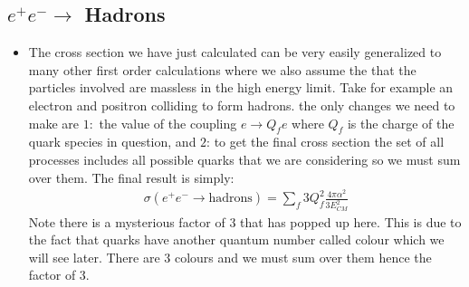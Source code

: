 \documentclass[11pt]{article}
\numberwithin{equation}{section}
\begin{document}
\subsection{$e^+ e^- \rightarrow $ Hadrons} %
\label{sub:_e_e_rightarrow_hadrons}
\begin{itemize}
    \item The cross section we have just calculated can be very easily generalized to many other first order calculations where we also assume the that the particles involved are massless in the high energy limit. Take for example an electron and positron colliding to form hadrons. the only changes we need to make are $1:$ the value of the coupling $e \rightarrow Q_f e$ where $Q_f$ is the charge of the quark species in question, and $2$: to get the final cross section the set of all processes includes all possible quarks that we are considering so we must sum over them. The final result is simply:
    \begin{align*}
         \sigma(e^+e^- \rightarrow \text{hadrons}) =  \sum_f3Q_f^2\frac{4\pi\alpha^2}{3E_{CM}^2}
      \end{align*}  
      Note there is a mysterious factor of $3$ that has popped up here. This is due to the fact that quarks have another quantum number called colour which we will see later. There are $3$ colours and we must sum over them hence the factor of $3$. 
\end{itemize} 


\newpage
\end{document}
